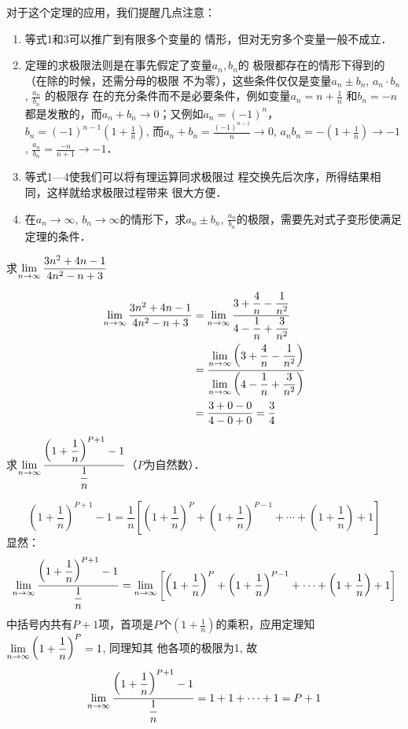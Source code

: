 对于这个定理的应用，我们提醒几点注意：
\begin{enumerate}
    \item 等式1和3可以推广到有限多个变量的
情形，但对无穷多个变量一般不成立．
\item 定理的求极限法则是在事先假定了变量$a_n,b_n$的
极限都存在的情形下得到的（在除的时候，还需分母的极限
不为零），这些条件仅仅是变量$a_n\pm b_n$, $a_n\cdot b_n$, $\frac{a_n}{b_n}$
的极限存
在的充分条件而不是必要条件，例如变量$a_n=n+\frac{1}{n}$
和$b_n=-n$都是发散的，而$a_n+b_n\to 0$；又例如$a_n=(-1)^n$，
$b_n=(-1)^{n-1}\left(1+\frac{1}{n}\right)$, 
而$a_n+b_n=\frac{(-1)^{n-1}}{n}\to 0$, $a_nb_n=-\left(1+\frac{1}{n}\right)\to -1$, $\frac{a_n}{b_n}=\frac{-n}{n+1}\to -1$．
\item 等式1---4使我们可以将有理运算同求极限过
程交换先后次序，所得结果相同，这样就给求极限过程带来
很大方便．
\item 在$a_n\to\infty$, $b_n\to\infty$的情形下，求$a_n\pm b_n$, $\frac{a_n}{b_n}$的极限，需要先对式子变形使满足定理的条件．
\end{enumerate}


\begin{example}
    求$\displaystyle\lim_{n\to\infty}\dfrac{3n^2+4n-1}{4n^2-n+3}$
\end{example}

\begin{solution}
\[\begin{split}
    \displaystyle\lim_{n\to\infty}\dfrac{3n^2+4n-1}{4n^2-n+3}&=\displaystyle\lim_{n\to\infty}\dfrac{3+\dfrac{4}{n}-\dfrac{1}{n^2}}{4-\dfrac{1}{n}+\dfrac{3}{n^2}}\\
    &=\dfrac{\displaystyle\lim_{n\to\infty}\left(3+\dfrac{4}{n}-\dfrac{1}{n^2}\right)}{\displaystyle\lim_{n\to\infty}\left(4-\dfrac{1}{n}+\dfrac{3}{n^2}\right)}\\
    &=\dfrac{3+0-0}{4-0+0}=\dfrac{3}{4}
\end{split}\]    
\end{solution}

\begin{example}
求$\displaystyle\lim_{n\to\infty}\dfrac{\left(1+\dfrac{1}{n}\right)^{P+1}-1}{\dfrac{1}{n}}$（$P$为自然数）．
\end{example}

\begin{solution}
\[\left(1+\frac{1}{n}\right)^{P+1}-1=\frac{1}{n}\left[\left(1+\frac{1}{n}\right)^{P}+\left(1+\frac{1}{n}\right)^{P-1}+\cdots+\left(1+\frac{1}{n}\right)+1\right]\]
    显然：
\[    \displaystyle\lim_{n\to\infty}\dfrac{\left(1+\dfrac{1}{n}\right)^{P+1}-1}{\dfrac{1}{n}}=\displaystyle\lim_{n\to\infty}\left[\left(1+\dfrac{1}{n}\right)^{P}+\left(1+\dfrac{1}{n}\right)^{P-1}+\cdots+\left(1+\dfrac{1}{n}\right)+1\right]
\]
中括号内共有$P+1$项，首项是$P$个$\left(1+\frac{1}{n}\right)$的乘积，应用定理知$\displaystyle\lim_{n\to\infty} \left(1+\dfrac{1}{n}\right)^{P}=1$, 同理知其
他各项的极限为1, 故
\[    \displaystyle\lim_{n\to\infty}\dfrac{\left(1+\dfrac{1}{n}\right)^{P+1}-1}{\dfrac{1}{n}}=1+1+\cdots+1=P+1
\]
\end{solution}


